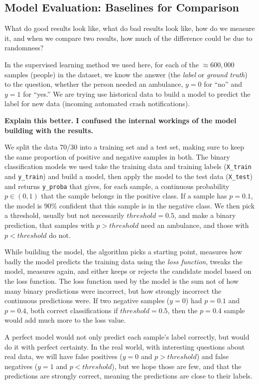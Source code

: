 \subsection{Model Evaluation:  Baselines for Comparison}

What do good results look like, what do bad results look like, how do we measure it, and when we compare two results, how much of the difference could be due to randomness?

In the supervised learning method we used here, for each of the $\approx 600,000$ samples (people) in the dataset, we know the answer (the {\it label} or {\it ground truth}) to the question, whether the person needed an ambulance, $y=0$ for ``no'' and $y=1$ for ``yes.''  We are trying use historical data to build a model to predict the label for new data (incoming automated crash notifications).

{\bf
Explain this better.  I confused the internal workings of the model building with the results.
}

We split the data 70/30 into a training set and a test set, making sure to keep the same proportion of positive and negative samples in both.  The binary classification models we used take the training data and training labels (\verb|X_train| and \verb|y_train|) and build a model, then apply the model to the test data (\verb|X_test|) and returns \verb|y_proba| that gives, for each sample, a continuous probability $p \in (0,1)$ that the sample belongs in the positive class.   If a sample has $p = 0.1$, the model is 90\% confident that this sample is in the negative class.   We then pick a threshold, usually but not necessarily $threshold = 0.5$, and make a binary prediction, that samples with $p > threshold$ need an ambulance, and those with $p < threshold$ do not.   

While building the model, the algorithm picks a starting point, measures how badly the model predicts the training data using the {\it loss function}, tweaks the model, measures again, and either keeps or rejects the candidate model based on the loss function.  The loss function used by the model is the sum not of how many binary predictions were incorrect, but how strongly incorrect the continuous predictions were.  If two negative samples ($y=0$) had $p=0.1$ and $p=0.4$, both correct classifications if $threshold=0.5$, then the $p=0.4$ sample would add much more to the loss value.  

A perfect model would not only predict each sample's label correctly, but would do it with perfect certainty.  In the real world, with interesting questions about real data, we will have false positives ($y=0$ and $p>threshold$) and false negatives ($y=1$ and $p<threshold$), but we hope those are few, and that the predictions are strongly correct, meaning the predictions are close to their labels.


